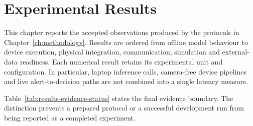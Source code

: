\chapter{Experimental Results}
\label{ch:results}

This chapter reports the accepted observations produced by the protocols in
Chapter~\ref{ch:methodology}. Results are ordered from offline model behaviour
to device execution, physical integration, communication, simulation and
external-data readiness. Each numerical result retains its experimental unit
and configuration. In particular, laptop inference calls, camera-free device
pipelines and live alert-to-decision paths are not combined into a single
latency measure.

Table~\ref{tab:results-evidence-status} states the final evidence boundary.
The distinction prevents a prepared protocol or a successful
development run from being reported as a completed experiment.

